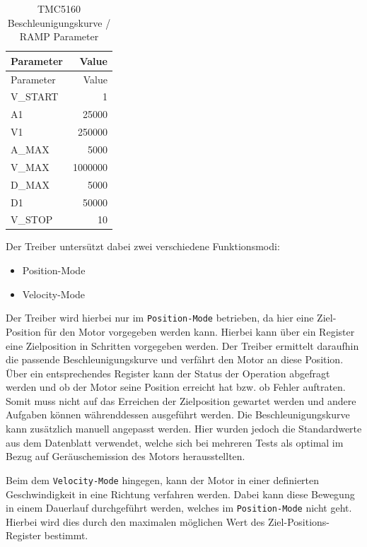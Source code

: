 \begin{longtable}[]{@{}lr@{}}
\caption{TMC5160 Beschleunigungskurve / RAMP Parameter
\label{tmcrampparams}}\tabularnewline
\toprule
Parameter & Value\tabularnewline
\midrule
\endfirsthead
\toprule
Parameter & Value\tabularnewline
\midrule
\endhead
V\_START & 1\tabularnewline
A1 & 25000\tabularnewline
V1 & 250000\tabularnewline
A\_MAX & 5000\tabularnewline
V\_MAX & 1000000\tabularnewline
D\_MAX & 5000\tabularnewline
D1 & 50000\tabularnewline
V\_STOP & 10\tabularnewline
\bottomrule
\end{longtable}

Der Treiber untersützt dabei zwei verschiedene Funktionsmodi:

\begin{itemize}
\tightlist
\item
  Position-Mode
\item
  Velocity-Mode
\end{itemize}

Der Treiber wird hierbei nur im \passthrough{\lstinline!Position-Mode!}
betrieben, da hier eine Ziel-Position für den Motor vorgegeben werden
kann. Hierbei kann über ein Register eine Zielposition in Schritten
vorgegeben werden. Der Treiber ermittelt daraufhin die passende
Beschleunigungskurve und verfährt den Motor an diese Position. Über ein
entsprechendes Register kann der Status der Operation abgefragt werden
und ob der Motor seine Position erreicht hat bzw. ob Fehler auftraten.
Somit muss nicht auf das Erreichen der Zielposition gewartet werden und
andere Aufgaben können währenddessen ausgeführt werden. Die
Beschleunigungskurve kann zusätzlich manuell angepasst werden. Hier
wurden jedoch die Standardwerte aus dem Datenblatt verwendet, welche
sich bei mehreren Tests als optimal im Bezug auf Geräuschemission des
Motors herausstellten.

Beim dem \passthrough{\lstinline!Velocity-Mode!} hingegen, kann der
Motor in einer definierten Geschwindigkeit in eine Richtung verfahren
werden. Dabei kann diese Bewegung in einem Dauerlauf durchgeführt
werden, welches im \passthrough{\lstinline!Position-Mode!} nicht geht.
Hierbei wird dies durch den maximalen möglichen Wert des
Ziel-Positions-Register bestimmt.

